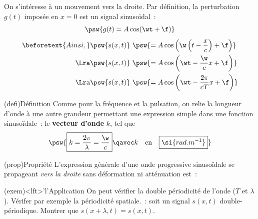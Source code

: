 \documentclass[../../main/main.tex]{subfiles}
\begin{document}
On s'intéresse à un mouvement vers la droite. Par définition, la perturbation
$g(t)$ imposée en $x=0$ est un signal sinusoïdal~:
\[\psw{g(t) = A\cos(\wt+\f)}\]
\begin{align*}
	\beforetext{Ainsi,}
	\psw{s(x,t)}~ &
	\psw{= A\cos\left(\w\left(t - \frac{x}{c}\right) +\f\right)}
	\\\Lra
	\psw{s(x,t)}~ &
	\psw{= A\cos\left(\wt - \frac{\w}{c}x +\f\right)}
	\\\Lra
	\psw{s(x,t)}~ &
	\psw{= A\cos\left(\wt - \frac{2\pi}{cT}x +\f\right)}
\end{align*}

\begin{tcb}(defi){Définition}
	Comme pour la fréquence et la pulsation, on relie la longueur d'onde à une
	autre grandeur permettant une expression simple dans une fonction
	sinusoïdale~: le \textbf{vecteur d'onde} $k$, tel que
	\[\psw{\boxed{k = \frac{2\pi}{\lambda} = \frac{\w}{c}}
			\qavec
			k\quad\text{en}\quad\boxed{\si{rad.m^{-1}}}}\]
\end{tcb}
\begin{tcb}(prop){Propriété}
	L'expression générale d'une onde progressive sinusoïdale se propageant
	\textit{vers la droite} sans déformation ni atténuation est~:
	\vspace{-10pt}
\end{tcb}

\begin{tcb}(exem)<lft>'l'{Application}
	On peut vérifier la double périodicité de l'onde ($T$ et $\lambda$). Vérifer
	par exemple la périodicité spatiale.~: soit un signal $s (x,t)$
	double-périodique. Montrer que $s (x+\lambda,t) = s (x,t)$.
	\tcblower
	\vspace{-20pt}
\end{tcb}
\end{document}
